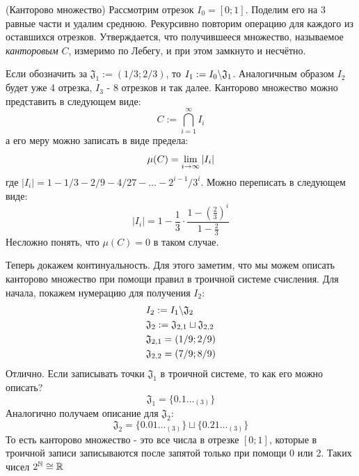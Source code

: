 \begin{example} (Канторово множество)
	Рассмотрим отрезок $I_0 = [0; 1]$. Поделим его на 3 равные части и удалим среднюю. Рекурсивно повторим операцию для каждого из оставшихся отрезков. Утверждается, что получившееся множество, называемое \textit{канторовым} $C$, измеримо по Лебегу, и при этом замкнуто и несчётно.
	
	Если обозначить за $\mathfrak{J}_1 := (1/3; 2/3)$, то $I_1 := I_0 \backslash \mathfrak{J}_1$. Аналогичным образом $I_2$ будет уже 4 отрезка, $I_3$ - 8 отрезков и так далее. Канторово множество можно представить в следующем виде:
	\[
		C := \bigcap_{i = 1}^\infty I_i
	\]
	а его меру можно записать в виде предела:
	\[
		\mu(C) = \lim\limits_{i \to \infty} |I_i|
	\]
	где $|I_i| = 1 - 1/3 - 2/9 - 4/27 - \ldots - 2^{i - 1} / 3^i$. Можно переписать в следующем виде:
	\[
		|I_i| = 1 - \frac{1}{3} \cdot \frac{1 - \left(\frac{2}{3}\right)^i}{1 - \frac{2}{3}}
	\]
	Несложно понять, что $\mu(C)  = 0$ в таком случае.
	
	Теперь докажем континуальность. Для этого заметим, что мы можем описать канторово множество при помощи правил в троичной системе счисления. Для начала, покажем нумерацию для получения $I_2$:
	\begin{align*}
		&{I_2 := I_1 \backslash \mathfrak{J}_2}
		\\
		&{\mathfrak{J}_2 := \mathfrak{J}_{2, 1} \sqcup \mathfrak{J}_{2, 2}}
		\\
		&{\mathfrak{J}_{2, 1} = (1/9; 2/9)}
		\\
		&{\mathfrak{J}_{2, 2} = (7/9; 8/9)}
	\end{align*}
	Отлично. Если записывать точки $\mathfrak{J}_1$ в троичной системе, то как его можно описать?
	\[
		\mathfrak{J}_1 = \{0.1\ldots_{(3)}\}
	\]
	Аналогично получаем описание для $\mathfrak{J}_2$:
	\[
		\mathfrak{J}_2 = \{0.01\ldots_{(3)}\} \sqcup \{0.21\ldots_{(3)}\}
	\]
	То есть канторово множество - это все числа в отрезке $[0; 1]$, которые в троичной записи записываются после запятой только при помощи 0 или 2. Таких чисел $2^{\mathbb{N}} \cong \mathbb{R}$
\end{example}

